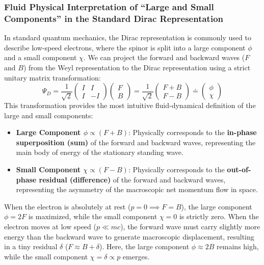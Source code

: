 \documentclass[12pt, a4paper]{article}
\begin{document}
\subsubsection{Fluid Physical Interpretation of ``Large and Small Components'' in the Standard Dirac Representation}

In standard quantum mechanics, the Dirac representation is commonly used to describe low-speed electrons, where the spinor is split into a large component $\phi$ and a small component $\chi$. We can project the forward and backward waves ($F$ and $B$) from the Weyl representation to the Dirac representation using a strict unitary matrix transformation:
\begin{equation}
    \Psi_D = \frac{1}{\sqrt{2}} \begin{pmatrix} I & I \\ I & -I \end{pmatrix} \begin{pmatrix} F \\ B \end{pmatrix} = \frac{1}{\sqrt{2}} \begin{pmatrix} F + B \\ F - B \end{pmatrix} \doteq \begin{pmatrix} \phi \\ \chi \end{pmatrix}
\end{equation}
This transformation provides the most intuitive fluid-dynamical definition of the large and small components:
\begin{itemize}
    \item \textbf{Large Component $\phi \propto (F + B)$}: Physically corresponds to the \textbf{in-phase superposition (sum)} of the forward and backward waves, representing the main body of energy of the stationary standing wave.
    \item \textbf{Small Component $\chi \propto (F - B)$}: Physically corresponds to the \textbf{out-of-phase residual (difference)} of the forward and backward waves, representing the asymmetry of the macroscopic net momentum flow in space.
\end{itemize}

When the electron is absolutely at rest ($p=0 \implies F=B$), the large component $\phi = 2F$ is maximized, while the small component $\chi = 0$ is strictly zero. When the electron moves at low speed ($p \ll mc$), the forward wave must carry slightly more energy than the backward wave to generate macroscopic displacement, resulting in a tiny residual $\delta$ ($F \approx B + \delta$). Here, the large component $\phi \approx 2B$ remains high, while the small component $\chi = \delta \propto p$ emerges.
\end{document}
